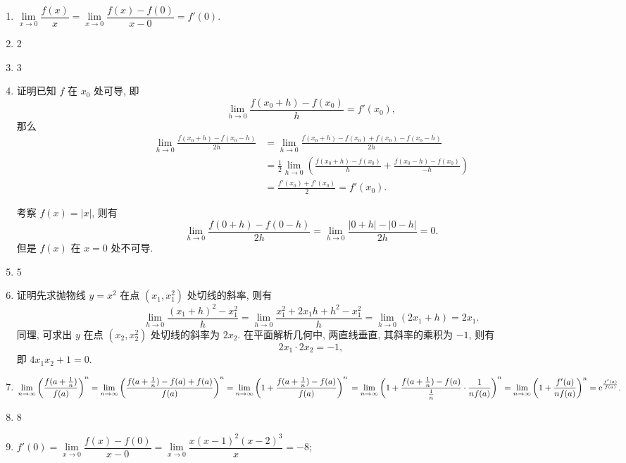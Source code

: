 \documentclass[a4paper, 11pt]{ctexart}
\begin{document}
\pagestyle{empty}
\begin{enumerate}
    \item %
        $\lim\limits_{x\to0}\dfrac{f(x)}{x} = \lim\limits_{x\to0}\dfrac{f(x) - f(0)}{x - 0} = f'(0)$.
    \item 2
    \item 3
    \item %
        {\heiti 证明}\quad 已知 $f$ 在 $x_0$ 处可导, 即
        \[
            \lim_{h\to0}\frac{f(x_0 + h) - f(x_0)}{h} = f'(x_0),    
        \]
        那么
        \begin{align*}
            \lim_{h\to0}\frac{f(x_0+h) - f(x_0-h)}{2h} &= \lim_{h\to0}\frac{f(x_0+h) - f(x_0) + f(x_0) - f(x_0 - h)}{2h} \\
                                                         &= \frac12\lim_{h\to0}\left(\frac{f(x_0+h) - f(x_0)}{h} + \frac{f(x_0 - h) - f(x_0)}{-h}\right) \\
                                                         &= \frac{f'(x_0) + f'(x_0)}{2} = f'(x_0).
        \end{align*}

        考察 $f(x) = |x|$, 则有
        \[
            \lim_{h\to0}\frac{f(0+h) - f(0-h)}{2h} = \lim_{h\to0}\frac{|0+h| - |0-h|}{2h} = 0.
        \]
        但是 $f(x)$ 在 $x = 0$ 处不可导.
    \item 5
    \item %
        {\heiti 证明}\quad 先求抛物线 $y = x^2$ 在点 $(x_1, x_1^2)$ 处切线的斜率, 则有
        \[
            \lim_{h\to0}\frac{(x_1+h)^2 - x_1^2}{h} = \lim_{h\to0}\frac{x_1^2 + 2x_1h + h^2 - x_1^2}{h} = \lim_{h\to0}(2x_1 + h) = 2x_1.    
        \]
        同理, 可求出 $y$ 在点 $(x_2, x_2^2)$ 处切线的斜率为 $2x_2$. 在平面解析几何中, 两直线垂直, 其斜率的乘积为 $-1$, 则有
        \[
            2x_1\cdot2x_2 = -1,    
        \]
        即 $4x_1x_2 + 1 = 0$.
    \item %
        $
            \lim\limits_{n\to\infty}\left(\dfrac{f(a + \frac1n)}{f(a)}\right)^n
            = \lim\limits_{n\to\infty}\left(\dfrac{f(a + \frac1n) - f(a) + f(a)}{f(a)}\right)^n
            = \lim\limits_{n\to\infty}\left(1 + \dfrac{f(a + \frac1n) - f(a)}{f(a)}\right)^n \\
            = \lim\limits_{n\to\infty}\left(1 + \dfrac{f(a + \frac1n) - f(a)}{\frac1n} \cdot \dfrac{1}{nf(a)}\right)^n
            = \lim\limits_{n\to\infty}\left(1 + \dfrac{f'(a)}{nf(a)}\right)^n
            = \mathrm{e}^{\frac{f'(a)}{f(a)}}.
        $
    \item 8
    \item %
        $f'(0) = \lim\limits_{x\to0}\dfrac{f(x) - f(0)}{x - 0} = \lim\limits_{x\to0}\dfrac{x(x-1)^2(x-2)^3}{x} = -8$;


\end{enumerate}
\end{document}
